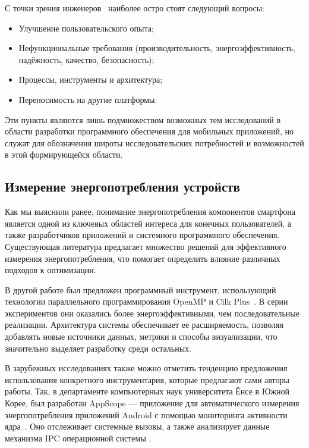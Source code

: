 \documentclass[a4paper,14pt]{extarticle} %
\begin{document}
	С точки зрения инженеров~\parencite{wasserman2010software} наиболее остро стоят следующий вопросы: 
	\begin{itemize}
		\item Улучшение пользовательского опыта; 
		\item Нефункциональные требования (производительность, энергоэффективность, надёжность, качество, безопасность);
		\item Процессы, инструменты и архитектура; 
		\item Переносимость на другие платформы. 
	\end{itemize}

	Эти пункты являются лишь подмножеством возможных тем исследований в области разработки программного обеспечения для мобильных приложений, но служат для обозначения широты исследовательских потребностей и возможностей в этой формирующейся области.
	
	\subsection{Измерение энергопотребления устройств}

	Как мы выяснили ранее, понимание энергопотребления компонентов смартфона является одной из ключевых областей интереса для конечных пользователей, а также разработчиков приложений и системного программного обеспечения. Существующая литература предлагает множество решений для эффективного измерения энергопотребления, что помогает определить влияние различных подходов к оптимизации.
	
	В другой работе был предложен программный инструмент, использующий технологии параллельного программирования OpenMP и Cilk Plus~\parencite{калачев2013разработка}. В серии экспериментов они оказались более энергоэффективными, чем последовательные реализации. Архитектура системы обеспечивает ее расширяемость, позволяя добавлять новые источники данных, метрики и способы визуализации, что значительно выделяет разработку среди остальных.
	
	В зарубежных исследованиях также можно отметить тенденцию предложения использования конкретного инструментария, которые предлагают сами авторы работы. Так, в департаменте компьютерных наук университета Ёнсе в Южной Корее, был разработан AppScope --- приложение для автоматического измерения энергопотребления приложений Android с помощью мониторинга активности ядра~\parencite{yoon2012appscope}. Оно отслеживает системные вызовы, а также анализирует данные механизма IPC операционной системы . 
	
\end{document}
